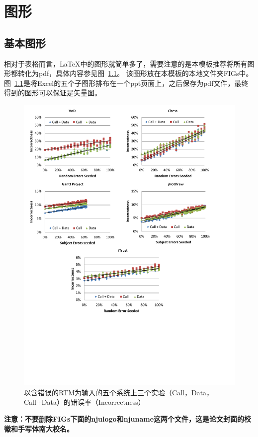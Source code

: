 \chapter{图形}

\section{基本图形}
相对于表格而言，LaTeX中的图形就简单多了，需要注意的是本模板推荐将所有图形都转化为pdf，具体内容参见图~\ref{fig_errorExpCH4}。
该图形放在本模板的本地文件夹FIGs中。
图~\ref{fig_errorExpCH4}是将Excel的五个子图形排布在一个ppt页面上，之后保存为pdf文件，最终得到的图形可以保证是矢量图。


\begin{figure}[htb]
  \centering
  \includegraphics[width=5in]{FIGs/chapter4/errorExpCH4.pdf}
  \caption{以含错误的RTM为输入的五个系统上三个实验（Call，Data，Call+Data）的错误率（Incorrectness）}\label{fig_errorExpCH4}
\end{figure}

\textbf{注意：不要删除FIGs下面的njulogo和njuname这两个文件，这是论文封面的校徽和手写体南大校名。}

